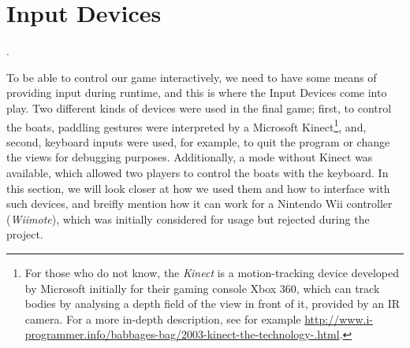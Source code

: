 \section{Input Devices}
.

To be able to control our game interactively, we need to have some means of providing input during runtime, and this is where the Input Devices come into play. Two different kinds of devices were used in the final game; first, to control the boats, paddling gestures were interpreted by a Microsoft Kinect\footnote{For those who do not know, the \emph{Kinect} is a motion-tracking device developed by Microsoft initially for their gaming console Xbox 360, which can track bodies by analysing a depth field of the view in front of it, provided by an IR camera. For a more in-depth description, see for example \url{http://www.i-programmer.info/babbages-bag/2003-kinect-the-technology-.html}.}, and, second, keyboard inputs were used, for example, to quit the program or change the views for debugging purposes. Additionally, a mode without Kinect was available, which allowed two players to control the boats with the keyboard. In this section, we will look closer at how we used them and how to interface with such devices, and breifly mention how it can work for a Nintendo Wii controller (\emph{Wiimote}), which was initially considered for usage but rejected during the project.

